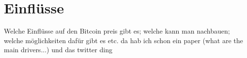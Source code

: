 \chapter{Einflüsse}

Welche Einflüsse auf den Bitcoin preis gibt es;
welche kann man nachbauen; welche möglichkeiten dafür gibt es etc.
da hab ich schon ein paper (what are the main drivers...) und das twitter ding